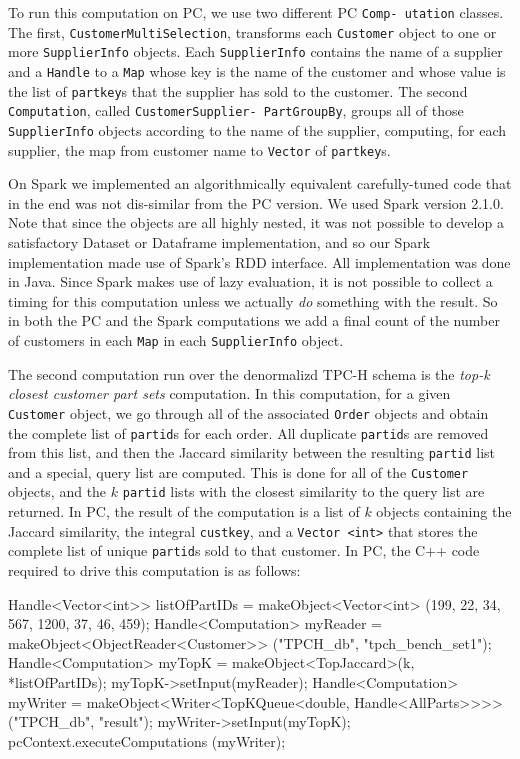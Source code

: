 To run this computation on PC, we use two different PC \texttt{Comp- utation} classes.  The first, 
\texttt{Customer}\-\texttt{MultiSelection}, transforms each 
\texttt{Customer} object to one or more
\texttt{SupplierInfo} objects. Each \texttt{SupplierInfo} contains
the name of a supplier
and a \texttt{Handle} to a \texttt{Map} whose key is the name of the customer and whose value is the list
of \texttt{partkey}s that the supplier has sold to the customer.
The second \texttt{Computation}, called
\texttt{CustomerSupplier- PartGroupBy},
groups all of those \texttt{SupplierInfo} objects according to the name of the supplier, computing, for each
supplier, the map from customer name to \texttt{Vector} of \texttt{partkey}s.

On Spark we implemented an algorithmically equivalent
carefully-tuned code that in the
end was not dis-similar from the PC
version.  We used
Spark version
2.1.0.
Note that since the objects are all highly nested, it was not possible to develop a satisfactory
Dataset or Dataframe implementation, and so our Spark implementation made use of Spark's RDD interface.  All
implementation was done in Java.  Since Spark makes use of lazy evaluation, it is not possible to collect a timing
for this computation unless we actually \emph{do} something with the result.  So in both the PC and the Spark computations
we add a final count of the number of customers in each \texttt{Map} in each \texttt{SupplierInfo} object.

The second computation run over the denormalizd TPC-H schema is the \emph{top-k closest customer part sets} computation.
In this computation, 
for a given
\texttt{Customer} object, we go through all of the associated 
\texttt{Order} objects and obtain the complete list of
\texttt{partid}s for each order.  All duplicate \texttt{partid}s are
removed from this list, and then the Jaccard similarity between the resulting \texttt{partid} list and a special, query
list are computed.  This is done for all of the \texttt{Customer} objects, and the $k$ \texttt{partid} lists with the 
closest similarity to the query list are returned.
In PC,
the result of the computation is a list of $k$ objects containing the Jaccard similarity, the integral \texttt{custkey}, and
a \texttt{Vector <int>} that stores the complete list of unique \texttt{partid}s sold to that customer.
In PC, the C++ code required to drive this computation is as follows:
\begin{code}
Handle<Vector<int>> listOfPartIDs = 
    makeObject<Vector<int>
       (199, 22, 34, 567, 1200, 37, 46, 459);
Handle<Computation> myReader = 
    makeObject<ObjectReader<Customer>>
       ("TPCH_db", "tpch_bench_set1");
Handle<Computation> myTopK = 
    makeObject<TopJaccard>(k, *listOfPartIDs);
myTopK->setInput(myReader);
Handle<Computation> myWriter = 
    makeObject<Writer<TopKQueue<double, 
      Handle<AllParts>>>>("TPCH_db", "result");
myWriter->setInput(myTopK);
pcContext.executeComputations (myWriter);
\end{code}

